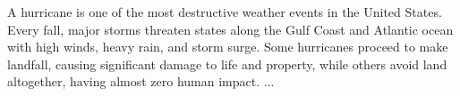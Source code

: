 
A hurricane is one of the most destructive weather events in the United States.
Every fall, major storms threaten states along the Gulf Coast and Atlantic ocean with high winds, heavy rain, and storm surge.
Some hurricanes proceed to make landfall, causing significant damage to life and property, while others avoid land altogether, having almost zero human impact.
...